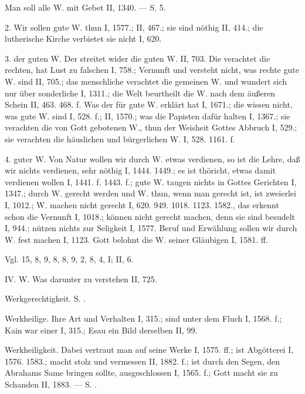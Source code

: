 Man soll alle W. mit Gebet  II, 1340. — S.  5.

2.  Wir sollen gute W. thun I, 1577.; II, 467.; sie sind nöthig II, 414.; die lutherische Kirche verbietet sie nicht I, 620.

3.  der guten W. Der  streitet wider die guten W. II, 703. Die  verachtet die rechten, hat Lust zu falschen I, 758.; Vernunft und  versteht nicht, was rechte gute W. sind II, 705.; das menschliche  verachtet die gemeinen W. und wundert sich nur über sonderliche I, 1311.; die Welt beurtheilt die W. nach dem äußeren Schein II, 463. 468. f. Was der  für gute W. erklärt hat I, 1671.; die  wissen nicht, was gute W. sind I, 528. f.; II, 1570.; was die Papisten dafür halten I, 1367.; sie verachten die von Gott gebotenen W., thun der Weisheit Gottes Abbruch I, 529.; sie verachten die häuslichen und bürgerlichen W. I, 528. 1161. f.

4.  guter W. Von Natur wollen wir durch W. etwas verdienen, so ist die Lehre, daß wir nichts verdienen, sehr nöthig I, 1444. 1449.; es ist thöricht, etwas damit verdienen wollen I, 1441. f. 1443. f.; gute W. taugen nichts in Gottes Gerichten I, 1347.; durch W. gerecht werden und W. thun, wenn man gerecht ist, ist zweierlei I, 1012.; W. machen nicht gerecht I, 620. 949. 1018. 1123. 1582., das erkennt schon die Vernunft I, 1018.; können nicht gerecht machen, denn sie sind besudelt I, 944.; nützen nichts zur Seligkeit I, 1577. Beruf und Erwählung sollen wir durch W. fest machen I, 1123. Gott belohnt die W. seiner Gläubigen I, 1581. ff.

Vgl.  15,  8,  9,  8,  8,  9,  2,  8,  4,  I; II, 6.

IV. W.  Was darunter zu verstehen II, 725.

Werkgerechtigkeit. S. .

Werkheilige. Ihre Art und Verhalten I, 315.; sind unter dem Fluch I, 1568. f.; Kain war einer I, 315.; Esau ein Bild derselben II, 99.

Werkheiligkeit. Dabei vertraut man auf seine Werke I, 1575. ff.; ist Abgötterei I, 1576. 1583.; macht stolz und vermessen II, 1882. f.; ist durch den Segen, den Abrahams Same bringen sollte, ausgeschlossen I, 1565. f.; Gott macht sie zu Schanden II, 1883. — S. .

